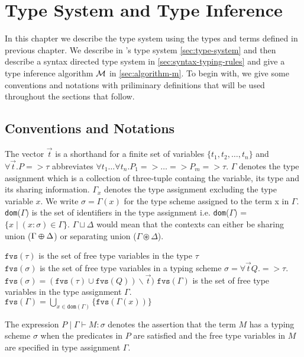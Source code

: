 \chapter{Type System and Type Inference}\label{chp:qub-type-system}
In this chapter we describe the type system using the types and terms defined in previous
chapter. We describe in \qub{}'s type system \cref{sec:type-system} and then describe a
syntax directed type system in \cref{sec:syntax-typing-rules} and give a type inference algorithm $\mathcal{M}$ in \cref{sec:algorithm-m}.
To begin with, we give some conventions and notations with priliminary definitions that will be used throughout the sections that follow.

\section{Conventions and Notations}
The vector $\vec{t}$ is a shorthand for a finite set of variables $\{t_1, t_2, \dots, t_n\}$ and  $\forall \vec{t}. P => \tau$ abbreviates
$\forall t_1 \dots \forall t_n. P_1 => \dots => P_m => \tau$.
$\Gamma$ denotes the type assignment which is a collection of three-tuple containg the variable, its type and its sharing information.
$\Gamma_{x}$ denotes the type assignment excluding the type variable $x$.
We write $\sigma = \Gamma(x)$ for the type scheme assigned to the term x in $\Gamma$.
\texttt{dom}($\Gamma$) is the set of identifiers in the type assignment i.e.
\texttt{dom}($\Gamma$) = $\{ x \mid (x:\sigma) \in \Gamma\}$.
$\Gamma \sqcup \Delta$ would mean that the contexts can either
be sharing union ($\Gamma \varoplus \Delta$) or separating union ($\Gamma \circledast \Delta$).

\begin{defn}
  $\texttt{fvs}(\tau)$ is the set of free type variables in the type $\tau$\\
  $\texttt{fvs}(\sigma)$ is the set of free type variables in a typing scheme $\sigma = \forall \vec{t} Q. => \tau$.\\
  $\texttt{fvs}(\sigma) = (\texttt{fvs}(\tau) \cup \texttt{fvs}(Q)) \backslash \vec{t})$
  $\texttt{fvs}(\Gamma)$ is the set of free type variables in the type assignment $\Gamma$.\\
  $\texttt{fvs}(\Gamma) = \bigcup_{x \in \texttt{dom}(\Gamma)} \{ \texttt{fvs}(\Gamma(x)) \}$
\end{defn}

\begin{defn}
The expression $P \mid \Gamma \vdash M : \sigma$ denotes the assertion that the term $M$ has a typing scheme $\sigma$
when the predicates in $P$ are satisfied and the free type variables in $M$ are specified in type assignment $\Gamma$.
\end{defn}

